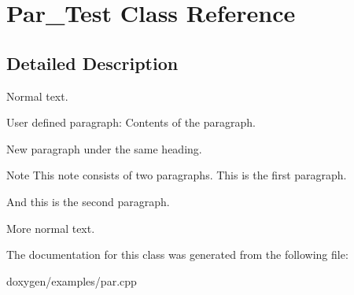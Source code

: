 \hypertarget{class_par___test}{}\section{Par\+\_\+\+Test Class Reference}
\label{class_par___test}


\subsection{Detailed Description}
Normal text.

\begin{DoxyParagraph}{User defined paragraph\+:}
Contents of the paragraph.
\end{DoxyParagraph}
\begin{DoxyParagraph}{}
New paragraph under the same heading.
\end{DoxyParagraph}
\begin{DoxyNote}{Note}
This note consists of two paragraphs. This is the first paragraph.
\end{DoxyNote}
\begin{DoxyParagraph}{}
And this is the second paragraph.
\end{DoxyParagraph}
More normal text. 

The documentation for this class was generated from the following file\+:\begin{DoxyCompactItemize}
\item 
doxygen/examples/par.\+cpp\end{DoxyCompactItemize}
